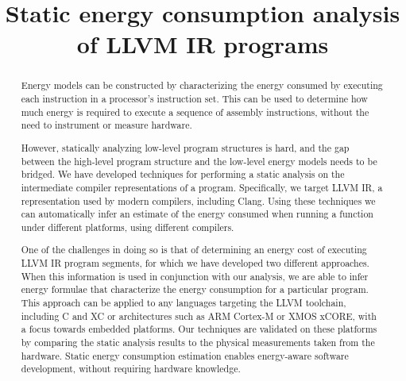 \documentclass[9pt,preprint]{sigplanconf}
\title{Static energy consumption analysis of LLVM IR programs}
\begin{document}
\setlength{\pdfpageheight}{\paperheight}
\setlength{\pdfpagewidth}{\paperwidth}








\titlebanner{}        \preprintfooter{}   


\maketitle

\begin{abstract}
Energy models can be constructed by characterizing the energy consumed by
executing each instruction in a processor's instruction set. This can be used to
determine how much energy is required to execute a sequence of assembly
instructions, without the need to instrument or measure hardware.

However, statically analyzing low-level program structures is hard, and the gap
between the high-level program structure and the low-level energy models needs
to be bridged. We have developed techniques for performing a static analysis on the
intermediate compiler representations of a program. Specifically, we target LLVM
IR, a representation used by modern compilers, including Clang. Using these
techniques we can automatically infer an estimate of the energy
consumed when running a function under different platforms, using different
compilers.

One of the challenges in doing so is that of determining an energy cost of
executing LLVM IR program segments, for which we have developed two different
approaches. When this information is used in conjunction with our analysis, we
are able to infer energy formulae that characterize the energy consumption for a
particular program. This approach can be applied to any languages targeting the
LLVM toolchain, including C and XC or architectures such as ARM Cortex-M or XMOS
xCORE, with a focus towards embedded platforms. Our techniques are validated on
these platforms by comparing the static analysis results to the physical
measurements taken from the hardware. Static energy consumption estimation
enables energy-aware software development, without requiring hardware knowledge.

\end{abstract}
\end{document}
